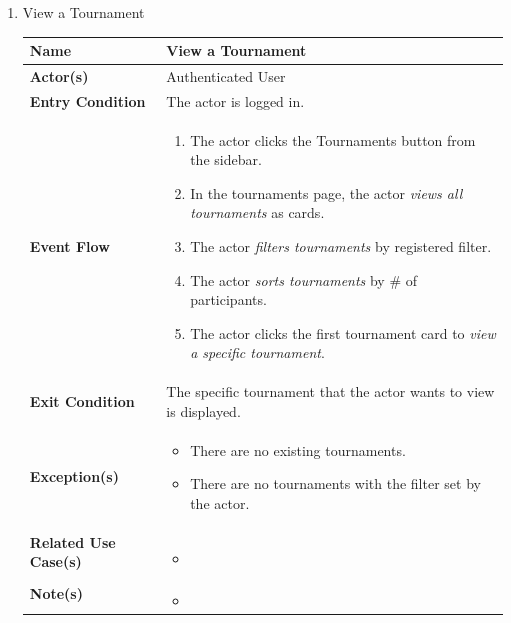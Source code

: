 \begin{enumerate}
\item View a Tournament
    \begin{center}
    \begin{tabular}{ | m{10em} | m{10cm}| } 
      \hline
      \textbf{Name} & View a Tournament  \\ 
      \hline
      \textbf{Actor(s)} & Authenticated User \\ 
      \hline
      \textbf{Entry Condition} & The actor is logged in. \\ 
      \hline
      \textbf{Event Flow} & 
          \begin{enumerate}[(1)]
              \item The actor clicks the Tournaments button from the sidebar.
              \item In the tournaments page, the actor \textit{views all tournaments} as cards.
              \item The actor \textit{filters tournaments} by registered filter.
              \item The actor \textit{sorts tournaments} by # of participants.
              \item The actor clicks the first tournament card to \textit{view a specific tournament}.
          \end{enumerate}
      \\ 
      \hline
      \textbf{Exit Condition} & The specific tournament that the actor wants to view is displayed.  \\ 
      \hline
      \textbf{Exception(s)} & 
      \begin{itemize}
          \item There are no existing tournaments.
          \item There are no tournaments with the filter set by the actor.
      \end{itemize}
          \\ 
      \hline
      \textbf{Related Use Case(s)} & 
      \begin{itemize}
          \item 
      \end{itemize}
          \\ 
      \hline
      \textbf{Note(s)} & 
      \begin{itemize}
          \item 
      \end{itemize}
          \\ 
      \hline
    \end{tabular}
\end{center}


\end{enumerate}
